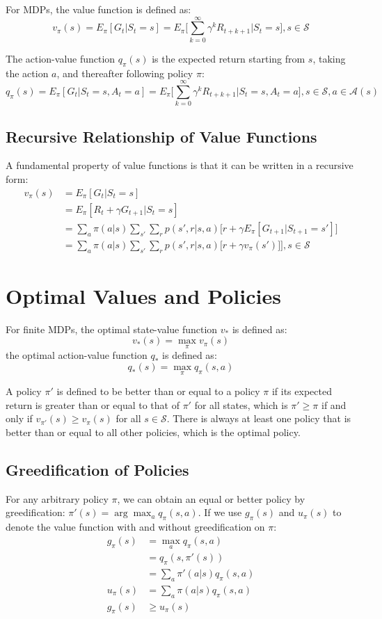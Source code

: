 \documentclass[twoside]{article}
\begin{document}
 For MDPs, the value function is defined as: 
$$
v_\pi(s) = E_\pi[G_t|S_t=s] = E_\pi\Big[\sum_{k=0}^{\infty}\gamma^k R_{t+k+1}\Big|S_t=s\Big], s\in\mathcal{S}
$$

The action-value function $q_\pi(s)$ is the expected return starting from $s$, taking the action $a$, and thereafter following policy $\pi$:
$$
q_\pi(s) = E_\pi[G_t|S_t=s, A_t=a] = E_\pi\Big[\sum_{k=0}^{\infty}\gamma^k R_{t+k+1}\Big|S_t=s, A_t=a \Big], s\in\mathcal{S}, a \in \mathcal{A}(s)
$$

\subsection{Recursive Relationship of Value Functions}

A fundamental property of value functions is that it can be written in a recursive form:
\begin{align*}
v_\pi(s) &= E_\pi[G_t|S_t=s] \\
&=  E_\pi[R_t + \gamma G_{t+1}|S_t=s] \\
&= \sum_a \pi(a|s)\sum_{s'}\sum_{r}p(s', r| s,a)\Big[r+\gamma E_\pi[G_{t+1}|S_{t+1}=s'] \Big] \\
&= \sum_a \pi(a|s)\sum_{s'}\sum_{r}p(s', r| s,a)\Big[r+\gamma v_\pi(s')] \Big], s \in \mathcal{S}
\end{align*}

\section{Optimal Values and Policies}

For finite MDPs, the optimal state-value function $v_*$ is defined as:
$$
v_*(s) = \max_\pi v_\pi(s)
$$
the optimal action-value function $q_*$ is defined as:
$$
q_*(s) = \max_\pi q_\pi(s, a)
$$

A policy $\pi'$ is defined to be better than or equal to a policy $\pi$ if its expected return is greater than or equal to that of $\pi'$ for all states, which is $\pi' \ge \pi$ if and only if $v_{\pi'}(s) \ge v_\pi(s)$ for all $s \in \mathcal{S}$. There is always at least one policy that is better than or equal to all other policies, which is the optimal policy.

\subsection{Greedification of Policies}

For any arbitrary policy $ \pi $, we can obtain an equal or better policy by greedification: $  \pi'(s) = \arg\max_a q_\pi(s,a) $.	
If we use $g_\pi(s)$ and $ u_\pi(s) $ to denote the value function with and without greedification on $ \pi $:
\begin{align*}
	g_\pi(s) &= \max_a q_\pi(s,a)\\
	&= q_\pi(s, \pi'(s))\\
	&= \sum_a \pi'(a|s) q_\pi(s,a)\\
	u_\pi(s) &= \sum_a \pi(a|s) q_\pi(s,a)\\
	g_\pi(s) &\ge u_\pi(s)
\end{align*}
\end{document}
